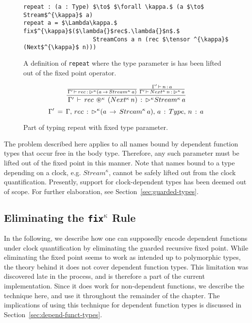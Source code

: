 \begin{figure}[h]
  \begin{lstlisting}[mathescape,title=\ttBlock]
repeat : (a : Type) $\to$ $\forall \kappa.$ (a $\to$ Stream$^{\kappa}$ a)
repeat a = $\Lambda\kappa.$ fix$^{\kappa}$($\lambda{}$rec$.\lambda{}$n$.$ 
                    StreamCons a n (rec $\tensor ^{\kappa}$ (Next$^{\kappa}$ n)))
\end{lstlisting}
  \caption{A definition of \texttt{repeat} where the type parameter is has been lifted
    out of the fixed point operator.}
  \label{fig:repeat_guarded_example_new}
\end{figure}

\begin{figure}[h]
\[
\frac { \frac {  }{ \Gamma '\, \vdash \, rec\, :\, \rhd ^{\kappa}(a\, \rightarrow
    \, Stream^{\kappa}\, a) } \, \frac { \Gamma '\, \vdash \, n\, :\, a }{ \Gamma '\,
    \vdash \, Next^{\kappa}\, n\, :\, \rhd ^{\kappa}\, a }  }{ \, \Gamma '\, \vdash \, rec\,
  \circledast ^{\kappa} \, (Next^{\kappa}\, n)\, :\, \rhd ^{\kappa}Stream^{\kappa}\, a }
\]
\[
 \Gamma '\, =\, \Gamma ,\, rec\, :\, \rhd ^{\kappa}(a\, \rightarrow \, Stream^{\kappa}\,
 a),\, a\, :\, Type,\, n\, :\, a
\]

  \caption{Part of typing repeat with fixed type parameter.}
  \label{fig:repeat_typing_new}
\end{figure}

The problem described here applies to all names bound by dependent function
types that occur free in the body type. Therefore, any such parameter must be
lifted out of the fixed point in this manner. Note that names bound to a type
depending on a clock, e.g. $Stream^{\kappa}$, cannot be safely lifted out from the clock
quantification. Presently, support for clock-dependent types has been deemed out
of scope. For further elaboration, see Section~\ref{sec:guarded-types}.

\subsection{Eliminating the \texttt{fix$^\kappa$} Rule}
\label{sec:fixkappa-rule}
In the following, we describe how one can supposedly encode dependent functions
under clock quantification by eliminating the guarded recursive fixed
point. While eliminating the fixed point seems to work as intended up to polymorphic
types, the theory behind it does not cover dependent function types. This
limitation was discovered late in the process, and is therefore a part of the
current implementation. Since it does work for non-dependent functions, we
describe the technique here, and use it throughout the remainder of the
chapter. The implications of using this technique for dependent function types
is discussed in Section~\ref{sec:depend-funct-types}.

